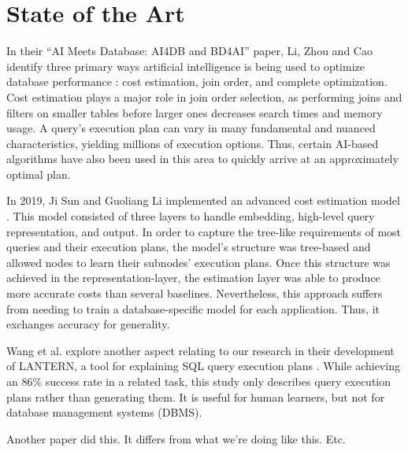 \section{State of the Art}
In their ``AI Meets Database: AI4DB and BD4AI'' paper, Li, Zhou and Cao identify three primary ways artificial intelligence is being used to optimize database performance \cite{li2021}: cost estimation, join order, and complete optimization. Cost estimation plays a major role in join order selection, as performing joins and filters on smaller tables before larger ones decreases search times and memory usage. A query's execution plan can vary in many fundamental and nuanced characteristics, yielding millions of execution options. Thus, certain AI-based algorithms have also been used in this area to quickly arrive at an approximately optimal plan.

In 2019, Ji Sun and Guoliang Li implemented an advanced cost estimation model \cite{sun2019}. This model consisted of three layers to handle embedding, high-level query representation, and output. In order to capture the tree-like requirements of most queries and their execution plans, the model's structure was tree-based and allowed nodes to learn their subnodes' execution plans. Once this structure was achieved in the representation-layer, the estimation layer was able to produce more accurate costs than several baselines. Nevertheless, this approach suffers from needing to train a database-specific model for each application. Thus, it exchanges accuracy for generality.

Wang et al. explore another aspect relating to our research in their development of LANTERN, a tool for explaining SQL query execution plans \cite{wang2021}. While achieving an 86\% success rate in a related task, this study only describes query execution plans rather than generating them. It is useful for human learners, but not for database management systems (DBMS).

Another paper did this. It differs from what we're doing like this. Etc.
